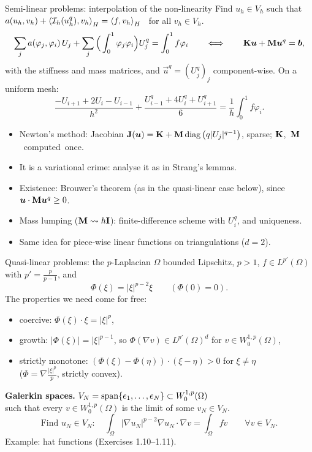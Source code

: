 \begin{frame}[squeeze]{Semi-linear problems: interpolation of the non-linearity}
  \small
  Find $u_h \in V_h$ such that \ $a(u_h, v_h) + \left\langle \mathcal I_h(u_h^q), v_h \right\rangle_H = \left\langle f, v_h \right\rangle_H$ \ for all $v_h \in V_h$.
  \[
    \sum_j a(\varphi_j, \varphi_i)\, U_j + \sum_j \Big(\int_0^1 \varphi_j\varphi_i\Big) U_j^q = \int_0^1 f\varphi_i
    \qquad\Longleftrightarrow\qquad
    \mathbf{K} \bm{u} + \mathbf{M} \bm{u}^q = \bm{b},
  \]
  with the stiffness and mass matrices, and $\vec u^q = (U_j^q)_j$ component-wise. On a uniform mesh:
  \[
    \frac{-U_{i+1} + 2U_i - U_{i-1}}{h^2} + \frac{U_{i-1}^q + 4U_i^q + U_{i+1}^q}{6} = \frac1h \int_0^1 f\varphi_i .
  \]
  \begin{itemize}
    \item Newton's method: Jacobian $\mathbf{J}(\bm{u}) = \mathbf{K} + \mathbf{M} \operatorname{diag}\big(q|U_j|^{q-1}\big)$, sparse; \mbox{$\mathbf{K}$, $\mathbf{M}$ computed once.}
    \item It is a \alert{variational crime}: analyse it as in Strang's lemmas.
    \item Existence: Brouwer's theorem (as in the quasi-linear case below), since $\bm{u}\cdot\mathbf{M}\bm{u}^q \ge 0$.
    \item Mass lumping ($\mathbf{M} \leadsto h\mathbf{I}$): finite-difference scheme with $U_i^q$, and uniqueness.
    \item Same idea for piece-wise linear functions on triangulations ($d = 2$).
  \end{itemize}
\end{frame}

\begin{frame}{Quasi-linear problems: the $p$-Laplacian}
  $\Omega$ bounded Lipschitz, $p > 1$, $f \in L^{p'}(\Omega)$ with $p' = \frac{p}{p-1}$, and
  \[
    \Phi(\xi) = |\xi|^{p-2}\xi \qquad (\Phi(0) = 0).
  \]
  The properties we need come for free:
  \begin{itemize}
    \item coercive: $\Phi(\xi)\cdot\xi = |\xi|^p$,
    \item growth: $|\Phi(\xi)| = |\xi|^{p-1}$, so $\Phi(\nabla v) \in L^{p'}(\Omega)^d$ for $v \in W^{1,p}_0(\Omega)$,
    \item strictly monotone: $(\Phi(\xi) - \Phi(\eta))\cdot(\xi - \eta) > 0$ for $\xi \ne \eta$\\ ($\Phi = \nabla \frac{|\xi|^p}{p}$, strictly convex).
  \end{itemize}
  \medskip
  \textbf{Galerkin spaces.} $V_N = \operatorname{span}\{e_1, \dots, e_N\} \subset W^{1,p}_0(\Omega)$\\ such that every $v \in W^{1,p}_0(\Omega)$ is the limit of some $v_N \in V_N$.
  \[
    \text{Find } u_N \in V_N: \quad \int_\Omega |\nabla u_N|^{p-2}\nabla u_N\cdot\nabla v = \int_\Omega f v \qquad \forall v \in V_N.
  \]
  {\small Example: hat functions (Exercises 1.10--1.11).}
\end{frame}

